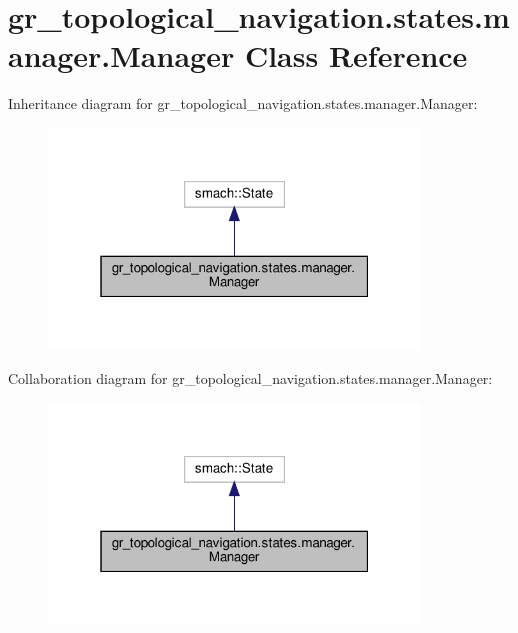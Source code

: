 \hypertarget{classgr__topological__navigation_1_1states_1_1manager_1_1Manager}{}\section{gr\+\_\+topological\+\_\+navigation.\+states.\+manager.\+Manager Class Reference}
\label{classgr__topological__navigation_1_1states_1_1manager_1_1Manager}


Inheritance diagram for gr\+\_\+topological\+\_\+navigation.\+states.\+manager.\+Manager\+:
\nopagebreak
\begin{figure}[H]
\begin{center}
\leavevmode
\includegraphics[width=280pt]{classgr__topological__navigation_1_1states_1_1manager_1_1Manager__inherit__graph}
\end{center}
\end{figure}


Collaboration diagram for gr\+\_\+topological\+\_\+navigation.\+states.\+manager.\+Manager\+:
\nopagebreak
\begin{figure}[H]
\begin{center}
\leavevmode
\includegraphics[width=280pt]{classgr__topological__navigation_1_1states_1_1manager_1_1Manager__coll__graph}
\end{center}
\end{figure}
